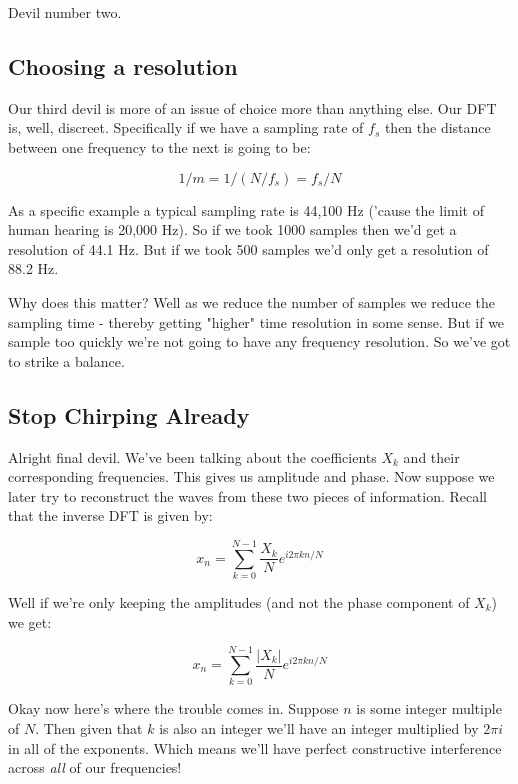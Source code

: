 \documentclass[10pt,a5paper]{book}
\begin{document}
Devil number two.

\subsection{Choosing a resolution}
Our third devil is more of an issue of choice more than anything else. Our DFT is, well, discreet. Specifically if we have a sampling rate of $f_s$ then the distance between one frequency to the next is going to be:

\begin{equation}
1/m = 1/(N / f_s) =f_s/N 
\end{equation}

As a specific example a typical sampling rate is 44,100 Hz ('cause the limit of human hearing is 20,000 Hz). So if we took 1000 samples then we'd get a resolution of 44.1 Hz. But if we took 500 samples we'd only get a resolution of 88.2 Hz. 

Why does this matter? Well as we reduce the number of samples we reduce the sampling time - thereby getting "higher" time resolution in some sense. But if we sample too quickly we're not going to have any frequency resolution. So we've got to strike a balance. 
\subsection{Stop Chirping Already}
Alright final devil. We've been talking about the coefficients $X_k$ and their corresponding frequencies. This gives us amplitude and phase. Now suppose we later try to reconstruct the waves from these two pieces of information. Recall that the inverse DFT is given by:

\begin{equation}
x_n = \sum_{k=0}^{N-1}\frac{X_k}{N} e^{i2\pi kn/N}
\end{equation}

Well if we're only keeping the amplitudes (and not the phase component of $X_k$) we get:

\begin{equation}
x_n = \sum_{k=0}^{N-1}\frac{|X_k|}{N} e^{i2\pi kn/N}
\end{equation}

Okay now here's where the trouble comes in. Suppose $n$ is some integer multiple of $N$. Then given that $k$ is also an integer we'll have an integer multiplied by $2\pi i$ in all of the exponents. Which means we'll have perfect constructive interference across \textit{all} of our frequencies! 
\end{document}
